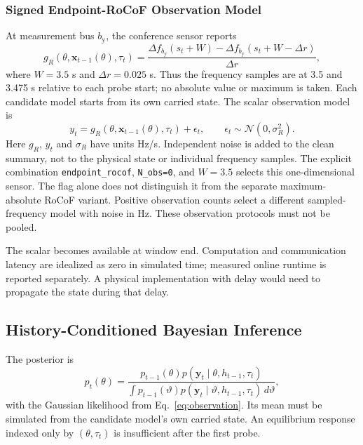 \documentclass[journal]{IEEEtran}
\begin{document}
\subsubsection{Signed Endpoint-RoCoF Observation Model}
At measurement bus $b_{\mathrm y}$, the conference sensor reports
\begin{equation}
g_R(\theta,\mathbf x_{t-1}(\theta),\tau_t)
=\frac{\Delta f_{b_{\mathrm y}}(s_t+W)
-\Delta f_{b_{\mathrm y}}(s_t+W-\Delta r)}{\Delta r},
\label{eq:rocof-observation-functional}
\end{equation}
where $W=3.5$ s and $\Delta r=0.025$ s. Thus the frequency samples are
at 3.5 and 3.475 s relative to each probe start; no absolute value or
maximum is taken. Each candidate model starts from its own carried state.
The scalar observation model is
\begin{equation}
y_t=g_R(\theta,\mathbf x_{t-1}(\theta),\tau_t)+\epsilon_t,
\qquad\epsilon_t\sim\mathcal N(0,\sigma_R^2).
\label{eq:observation}
\end{equation}
Here $g_R$, $y_t$ and $\sigma_R$ have units Hz/s. Independent noise is
added to the clean summary, not to the physical state or individual frequency
samples. The explicit combination \texttt{endpoint\_rocof},
\texttt{N\_obs=0}, and $W=3.5$ selects this one-dimensional sensor.
The flag alone does not distinguish it from the separate maximum-absolute
RoCoF variant. Positive observation counts select a different sampled-frequency
model with noise in Hz. These observation protocols must not be pooled.

The scalar becomes available at window end. Computation and communication
latency are idealized as zero in simulated time; measured online runtime is
reported separately. A physical implementation with delay would need to
propagate the state during that delay.

\subsection{History-Conditioned Bayesian Inference}
The posterior is
\begin{equation}
p_t(\theta)=
\frac{p_{t-1}(\theta)
 p(\mathbf y_t\mid\theta,h_{t-1},\tau_t)}
{\int p_{t-1}(\vartheta)
 p(\mathbf y_t\mid\vartheta,h_{t-1},\tau_t)\,d\vartheta},
\label{eq:posterior}
\end{equation}
with the Gaussian likelihood from Eq.~\eqref{eq:observation}. Its mean must
be simulated from the candidate model's own carried state. An equilibrium
response indexed only by $(\theta,\tau_t)$ is insufficient after the first probe.
\end{document}

